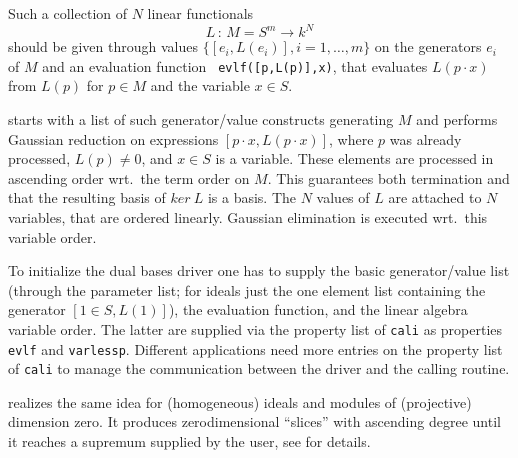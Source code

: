 Such a collection of $N$ linear functionals
\[L\,:\, M=S^m \longrightarrow k^N\]
should be given through values $\{[e_i,L(e_i)], i=1,\ldots,m\}$ on the
generators $e_i$ of $M$ and an evaluation function {\tt
evlf([p,L(p)],x)}, that evaluates $L(p\cdot x)$ from $L(p)$ for $p\in
M$ and the variable $x\in S$.

 starts with a list of such generator/value constructs
generating $M$ and performs Gaussian reduction on expressions $[p\cdot
x,L(p\cdot x)]$, where $p$ was already processed, $L(p)\neq 0$, and
$x\in S$ is a variable. These elements are processed in ascending order
wrt.\ the term order on $M$. This guarantees both termination and that
the resulting basis of $ker\ L$ is a \gr basis. The $N$ values of $L$
are attached to $N$ variables, that are ordered linearly. Gaussian
elimination is executed wrt.\ this variable order.

To initialize the dual bases driver one has to supply the basic
generator/value list (through the parameter list; for ideals just the
one element list containing the generator $[1\in S,L(1)]$), the
evaluation function, and the linear algebra variable order. The latter
are supplied via the property list of {\tt cali} as properties {\tt
evlf} and {\tt varlessp}. Different applications need more entries
on the property list of {\tt cali} to manage the communication between
the driver and the calling routine.

 realizes the same idea for (homogeneous) ideals and
modules of (projective) dimension zero. It produces zerodimensional
``slices'' with ascending degree until it reaches a supremum supplied
by the user, see \cite{MMM} for details.
\medskip

